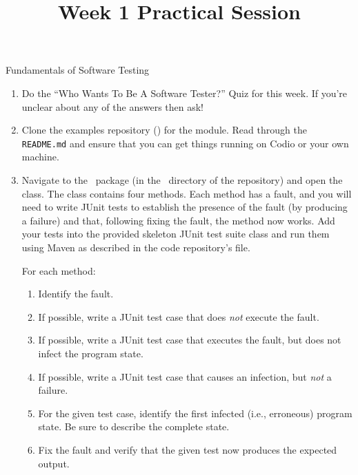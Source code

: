 



\title{Week 1 Practical Session}{Fundamentals of Software Testing}

\begin{enumerate}

    \item Do the ``Who Wants To Be A Software Tester?'' Quiz for this week. If
    you're unclear about any of the answers then ask!

    \item Clone the examples repository (\coderepourl) for the module. Read
    through the {\tt README.md} and ensure that you can get things running on
    Codio or your own machine.

    \item Navigate to the \practicalspackage~package (in the
    \practicalsdirectory~directory of the repository) and open the \weekoneclass
    class. The class contains four methods. Each method has a fault, and you
    will need to write JUnit tests to establish the presence of the fault (by
    producing a failure) and that, following fixing the fault, the method now
    works. Add your tests into the provided skeleton \testweekoneclass JUnit
    test suite class and run them using Maven as described in the code
    repository's \readmefile file.
    
    For each method:

        \begin{enumerate}

            \item Identify the fault.
            
            \item If possible, write a JUnit test case that does {\it not}
            execute the fault.
            
            \item If possible, write a JUnit test case that executes the fault,
            but does not infect the program state.

            \item If possible, write a JUnit test case that causes an infection,
            but {\it not} a failure.

            \item For the given test case, identify the first infected (i.e.,
            erroneous) program state. Be sure to describe the complete state.
            
            \item Fix the fault and verify that the given test now produces the
            expected output.


        \end{enumerate}

\end{enumerate}

